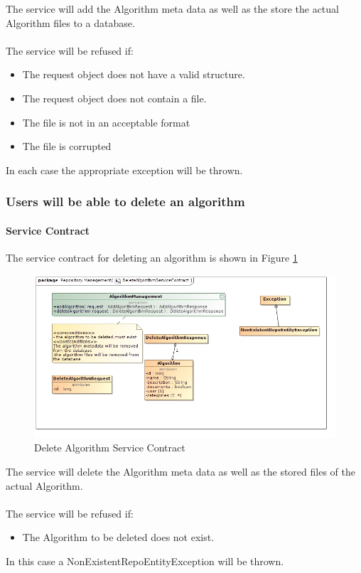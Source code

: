  The service will add the Algorithm meta data as well as the store the
 actual Algorithm files to a database.\\\\
 The service will be refused if:\\
	 \begin{itemize}
	 	\item The request object does not have a valid structure.	 	
	 	\item The request object does not contain a file.
	 	\item The file is not in an acceptable format
	 	\item The file is corrupted
	 \end{itemize}
In each case the appropriate exception will be thrown.

\subsubsection {Users will be able to delete an algorithm}
\paragraph{Service Contract}
The service contract for deleting an algorithm is shown in Figure \ref{fig:deleteAlgorithmService}

\begin{figure}[H]
  \begin{center}
  \includegraphics[scale=0.5]{../Diagrams and Charts/Test Data/DeleteAlgorithmServiceContract.jpg}
  \caption{Delete Algorithm Service Contract}
  \label{fig:deleteAlgorithmService}
  \end{center}  
 \end{figure}

 The service will delete the Algorithm meta data as well as the stored files
 of the actual Algorithm.\\\\
 The service will be refused if:\\
	 \begin{itemize}
	 	\item The Algorithm to be deleted does not exist.
	 \end{itemize}
In this case a NonExistentRepoEntityException will be thrown.

